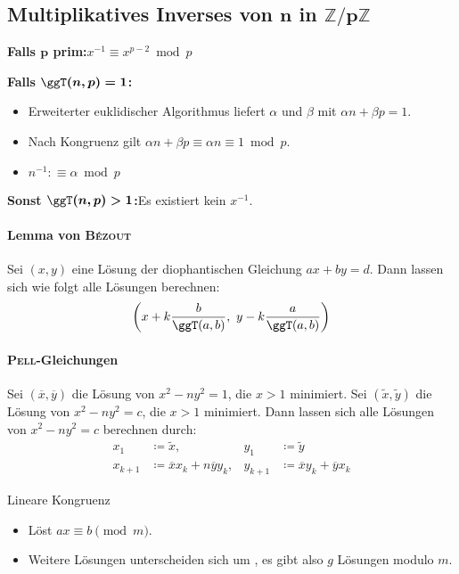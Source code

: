 \subsection{Multiplikatives Inverses von $\boldsymbol{n}$ in $\boldsymbol{\mathbb{Z}/p\mathbb{Z}}$}
\textbf{Falls $\boldsymbol{p}$ prim:}\quad $x^{-1} \equiv x^{p-2} \bmod p$

\textbf{Falls $\boldsymbol{\ggT(n, p) = 1}$:}
\begin{itemize}
	\item Erweiterter euklidischer Algorithmus liefert $\alpha$ und $\beta$ mit
	$\alpha n + \beta p = 1$.
	\item Nach Kongruenz gilt $\alpha n + \beta p \equiv \alpha n \equiv 1 \bmod p$.
	\item $n^{-1} :\equiv \alpha \bmod p$
\end{itemize}
\textbf{Sonst $\boldsymbol{\ggT(n, p) > 1}$:}\quad Es existiert kein $x^{-1}$.

\paragraph{Lemma von \textsc{Bézout}}
Sei $(x, y)$ eine Lösung der diophantischen Gleichung $ax + by = d$.
Dann lassen sich wie folgt alle Lösungen berechnen:
\[
\left(x + k\frac{b}{\ggT(a, b)},~y - k\frac{a}{\ggT(a, b)}\right)
\]

\paragraph{\textsc{Pell}-Gleichungen}
Sei $(\overline{x}, \overline{y})$ die Lösung von $x^2 - ny^2 = 1$, die $x>1$ minimiert.
Sei $(\tilde{x}, \tilde{y})$ die Lösung von $x^2-ny^2 = c$, die $x>1$ minimiert. Dann lassen
sich alle Lösungen von $x^2-ny^2=c$ berechnen durch:
\begin{align*}
	x_1&\coloneqq \tilde{x}, & y_1&\coloneqq\tilde{y}\\
	x_{k+1}&\coloneqq \overline{x}x_k+n\overline{y}y_k, & y_{k+1}&\coloneqq\overline{x}y_k+\overline{y}x_k
\end{align*}

\begin{algorithm}{Lineare Kongruenz}
	\begin{itemize}
		\item Löst $ax\equiv b\pmod{m}$.
		\item Weitere Lösungen unterscheiden sich um , es gibt
		also $g$ Lösungen modulo $m$.
	\end{itemize}
\end{algorithm}

